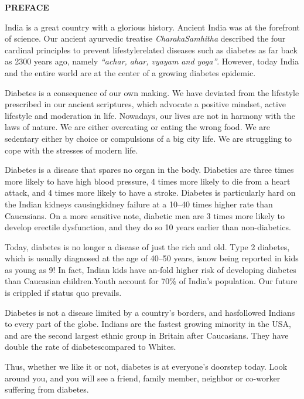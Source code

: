 \thispagestyle{empty}


\begin{center}
\Huge\textbf{PREFACE}
\end{center}

\vskip 20pt

India is a great country with a glorious history. Ancient India was at the forefront of science. Our ancient ayurvedic treatise \textit{Charaka\break Samhitha} described the four cardinal principles to prevent lifestyle\break related diseases such as diabetes as far back as 2300 years ago, namely \textit{“achar, ahar, vyayam and yoga”}. However, today India and the entire world are at the center of a growing diabetes epidemic.

Diabetes is a consequence of our own making. We have deviated from the lifestyle prescribed in our ancient scriptures, which advocate a positive mindset, active lifestyle and moderation in life. Nowadays, our lives are not in harmony with the laws of nature. We are either overeating or eating the wrong food. We are sedentary either by choice or compulsions of a big city life. We are struggling to cope with the stresses of modern life.

Diabetes is a disease that spares no organ in the body. Diabetics are three times more likely to have high blood pressure, 4 times more likely to die from a heart attack, and 4 times more likely to have a stroke. Diabetes is particularly hard on the Indian kidneys causing\break kidney failure at a 10–40 times higher rate than Caucasians. On a more sensitive note, diabetic men are 3 times more likely to develop erectile dysfunction, and they do so 10 years earlier than non-diabetics.

Today, diabetes is no longer a disease of just the rich and old. Type 2 diabetes, which is usually diagnosed at the age of 40–50 years, is\break now being reported in kids as young as 9! In fact, Indian kids have an-fold higher risk of developing diabetes than Caucasian children.\break Youth account for 70\% of India's population. Our future is crippled if status quo prevails.

Diabetes is not a disease limited by a country's borders, and has\break followed Indians to every part of the globe. Indians are the fastest growing minority in the USA, and are the second largest ethnic group in Britain after Caucasians. They have double the rate of diabetes\break compared to Whites.

Thus, whether we like it or not, diabetes is at everyone's doorstep today. Look around you, and you will see a friend, family member, neighbor or co-worker suffering from diabetes.

